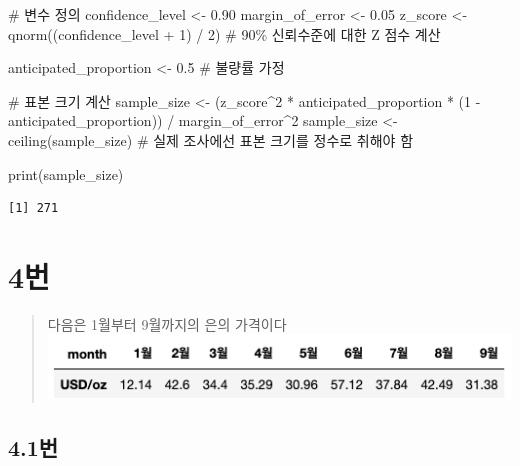 \documentclass[
  letterpaper,
  DIV=11,
  numbers=noendperiod]{scrreprt}
\newenvironment{Shaded}{\begin{snugshade}}{\end{snugshade}}
\newcommand{\CommentTok}[1]{\textcolor[rgb]{0.37,0.37,0.37}{#1}}
\newcommand{\DecValTok}[1]{\textcolor[rgb]{0.68,0.00,0.00}{#1}}
\newcommand{\FloatTok}[1]{\textcolor[rgb]{0.68,0.00,0.00}{#1}}
\newcommand{\FunctionTok}[1]{\textcolor[rgb]{0.28,0.35,0.67}{#1}}
\newcommand{\NormalTok}[1]{\textcolor[rgb]{0.00,0.23,0.31}{#1}}
\newcommand{\OtherTok}[1]{\textcolor[rgb]{0.00,0.23,0.31}{#1}}
\newcommand{\SpecialCharTok}[1]{\textcolor[rgb]{0.37,0.37,0.37}{#1}}
\begin{document}
\begin{Shaded}
\begin{Highlighting}[]
\CommentTok{\# 변수 정의}
\NormalTok{confidence\_level }\OtherTok{\textless{}{-}} \FloatTok{0.90}
\NormalTok{margin\_of\_error }\OtherTok{\textless{}{-}} \FloatTok{0.05}
\NormalTok{z\_score }\OtherTok{\textless{}{-}} \FunctionTok{qnorm}\NormalTok{((confidence\_level }\SpecialCharTok{+} \DecValTok{1}\NormalTok{) }\SpecialCharTok{/} \DecValTok{2}\NormalTok{)  }\CommentTok{\# 90\% 신뢰수준에 대한 Z 점수 계산}

\NormalTok{anticipated\_proportion }\OtherTok{\textless{}{-}} \FloatTok{0.5}  \CommentTok{\# 불량률 가정}

\CommentTok{\# 표본 크기 계산}
\NormalTok{sample\_size }\OtherTok{\textless{}{-}}\NormalTok{ (z\_score}\SpecialCharTok{\^{}}\DecValTok{2} \SpecialCharTok{*}\NormalTok{ anticipated\_proportion }\SpecialCharTok{*}\NormalTok{ (}\DecValTok{1} \SpecialCharTok{{-}}\NormalTok{ anticipated\_proportion)) }\SpecialCharTok{/}\NormalTok{ margin\_of\_error}\SpecialCharTok{\^{}}\DecValTok{2}
\NormalTok{sample\_size }\OtherTok{\textless{}{-}} \FunctionTok{ceiling}\NormalTok{(sample\_size)  }\CommentTok{\# 실제 조사에선 표본 크기를 정수로 취해야 함}

\FunctionTok{print}\NormalTok{(sample\_size)}
\end{Highlighting}
\end{Shaded}

\begin{verbatim}
[1] 271
\end{verbatim}

\hypertarget{uxbc88-26}{%
\chapter*{4번}\label{uxbc88-26}}


\begin{quote}
다음은 1월부터 9월까지의 은의 가격이다
\includegraphics{./test/26/problem4.png}
\end{quote}

\hypertarget{uxbc88-27}{%
\section*{4.1번}\label{uxbc88-27}}
\end{document}
